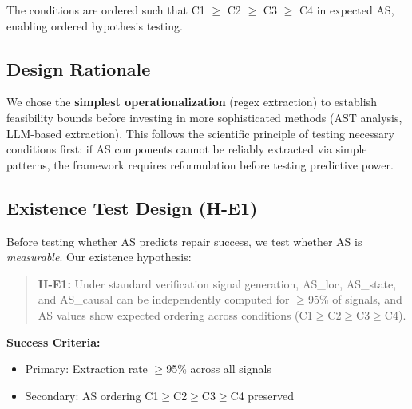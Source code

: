 The conditions are ordered such that C1 $\geq$ C2 $\geq$ C3 $\geq$ C4 in expected AS, enabling ordered hypothesis testing.

\subsection{Design Rationale}

We chose the \textbf{simplest operationalization} (regex extraction) to establish feasibility bounds before investing in more sophisticated methods (AST analysis, LLM-based extraction). This follows the scientific principle of testing necessary conditions first: if AS components cannot be reliably extracted via simple patterns, the framework requires reformulation before testing predictive power.

\subsection{Existence Test Design (H-E1)}

Before testing whether AS predicts repair success, we test whether AS is \emph{measurable}. Our existence hypothesis:

\begin{quote}
\textbf{H-E1:} Under standard verification signal generation, AS\_loc, AS\_state, and AS\_causal can be independently computed for $\geq$95\% of signals, and AS values show expected ordering across conditions (C1$\geq$C2$\geq$C3$\geq$C4).
\end{quote}

\textbf{Success Criteria:}
\begin{itemize}
    \item Primary: Extraction rate $\geq$95\% across all signals
    \item Secondary: AS ordering C1$\geq$C2$\geq$C3$\geq$C4 preserved
\end{itemize}
